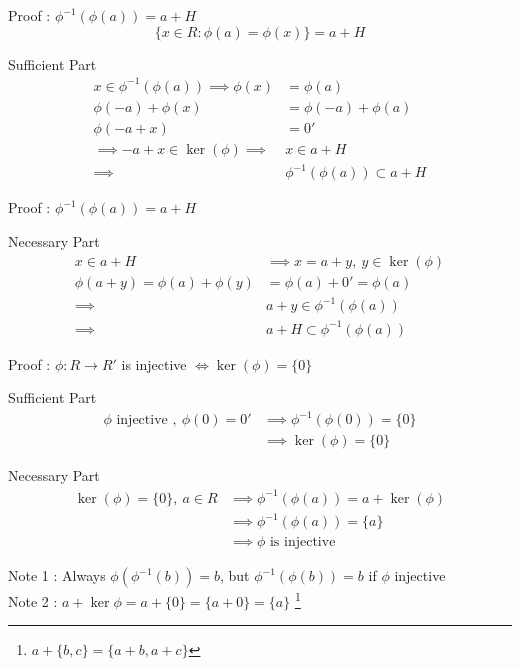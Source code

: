 \documentclass{beamer}
\begin{document}
\begin{frame}{Proof : $\phi^{-1}(\phi(a)) = a + H$}
	$$\{ x \in R : \phi(a) = \phi(x) \} = a+H$$
\begin{block}{Sufficient Part}
\begin{align*}
	x \in \phi^{-1}(\phi(a)) \implies \phi(x) & = \phi(a) \\
	\phi(-a) + \phi(x) & = \phi(-a) + \phi(a) \\
	\phi(-a+x) & = 0' \\
	\implies -a+x \in \ker(\phi) \implies & x \in a + H \\
	\implies & \phi^{-1}(\phi(a)) \subset a+H 
\end{align*}
\end{block}
\end{frame}

\begin{frame}{Proof : $\phi^{-1}(\phi(a)) = a + H$}
\begin{block}{Necessary Part}
\begin{align*}
	x \in a+H & \implies x = a+y,\ y \in \ker(\phi) \\
	\phi(a+y) = \phi(a) + \phi(y) & = \phi(a) + 0' = \phi(a)\\
	\implies & a+y \in \phi^{-1}(\phi(a))\\
	\implies & a+H \subset \phi^{-1}(\phi(a))
\end{align*}
\end{block}
\end{frame}

\begin{frame}{Proof : $\phi : R \to R'$ is injective $\iff \ker(\phi) = \{ 0 \}$}
\begin{block}{Sufficient Part}
\begin{align*}
	\phi \text{ injective },\ \phi(0) = 0' & \implies \phi^{-1}(\phi(0)) = \{ 0 \} \\
	& \implies \ker(\phi) = \{ 0 \} 
\end{align*}
\end{block}

\begin{block}{Necessary Part} 
\begin{align*}
	\ker(\phi) = \{ 0 \},\ a \in R & \implies \phi^{-1}(\phi(a)) = a+\ker(\phi) \\
	& \implies \phi^{-1}(\phi(a)) = \{ a \}\\
	& \implies \phi \text{ is injective }
\end{align*}
\end{block}
	Note 1 : Always $\phi(\phi^{-1}(b)) = b$, but $\phi^{-1}(\phi(b)) = b$ if $\phi$ injective\\
	Note 2 : $a + \ker{\phi} = a + \{ 0 \} = \{a+0\} = \{a\}$ \dag\footnote{$a+\{b,c\} = \{a+b,a+c\}$}
\end{frame}
\end{document}
